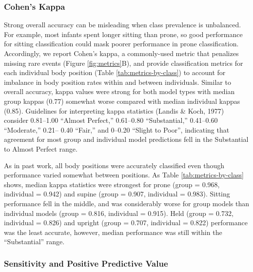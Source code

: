 \documentclass[
  man]{apa6}
\begin{document}
\hypertarget{cohens-kappa}{%
\subsubsection{Cohen's Kappa}\label{cohens-kappa}}

Strong overall accuracy can be misleading when class prevalence is unbalanced. For example, most infants spent longer sitting than prone, so good performance for sitting classification could mask poorer performance in prone classification. Accordingly, we report Cohen's kappa, a commonly-used metric that penalizes missing rare events (Figure \ref{fig:metrics}B), and provide classification metrics for each individual body position (Table \ref{tab:metrics-by-class}) to account for imbalance in body position rates within and between individuals. Similar to overall accuracy, kappa values were strong for both model types with median group kappas (0.77) somewhat worse compared with median individual kappas (0.85). Guidelines for interpreting kappa statistics (Landis \& Koch, 1977) consider 0.81--1.00 ``Almost Perfect,'' 0.61--0.80 ``Substantial,'' 0.41--0.60 ``Moderate,'' 0.21-- 0.40 ``Fair,'' and 0--0.20 ``Slight to Poor'', indicating that agreement for most group and individual model predictions fell in the Substantial to Almost Perfect range.

As in past work, all body positions were accurately classified even though performance varied somewhat between positions. As Table \ref{tab:metrics-by-class} shows, median kappa statistics were strongest for prone (group = 0.968, individual = 0.942) and supine (group = 0.907, individual = 0.983). Sitting performance fell in the middle, and was considerably worse for group models than individual models (group = 0.816, individual = 0.915). Held (group = 0.732, individual = 0.826) and upright (group = 0.707, individual = 0.822) performance was the least accurate, however, median performance was still within the ``Substantial'' range.

\hypertarget{sensitivity-and-positive-predictive-value}{%
\subsubsection{Sensitivity and Positive Predictive Value}\label{sensitivity-and-positive-predictive-value}}
\end{document}
